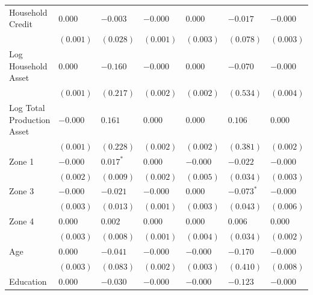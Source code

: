 \begin{tabular}{lllllll}
Household Credit                        &     $0.000$ &      $-0.003$ &     $-0.000$ &       $0.000$ &         $-0.017$ &      $-0.000$ \\
                                        &   $(0.001)$ &     $(0.028)$ &    $(0.001)$ &     $(0.003)$ &        $(0.078)$ &     $(0.003)$ \\
Log Household Asset                     &     $0.000$ &      $-0.160$ &     $-0.000$ &       $0.000$ &         $-0.070$ &      $-0.000$ \\
                                        &   $(0.001)$ &     $(0.217)$ &    $(0.002)$ &     $(0.002)$ &        $(0.534)$ &     $(0.004)$ \\
Log Total Production Asset              &    $-0.000$ &       $0.161$ &      $0.000$ &       $0.000$ &          $0.106$ &       $0.000$ \\
                                        &   $(0.001)$ &     $(0.228)$ &    $(0.002)$ &     $(0.002)$ &        $(0.381)$ &     $(0.002)$ \\
Zone 1                                  &    $-0.000$ &  $0.017 ^{*}$ &      $0.000$ &      $-0.000$ &         $-0.022$ &      $-0.000$ \\
                                        &   $(0.002)$ &     $(0.009)$ &    $(0.002)$ &     $(0.005)$ &        $(0.034)$ &     $(0.003)$ \\
Zone 3                                  &    $-0.000$ &      $-0.021$ &     $-0.000$ &       $0.000$ &    $-0.073 ^{*}$ &      $-0.000$ \\
                                        &   $(0.003)$ &     $(0.013)$ &    $(0.001)$ &     $(0.003)$ &        $(0.043)$ &     $(0.006)$ \\
Zone 4                                  &     $0.000$ &       $0.002$ &      $0.000$ &       $0.000$ &          $0.006$ &       $0.000$ \\
                                        &   $(0.003)$ &     $(0.008)$ &    $(0.001)$ &     $(0.004)$ &        $(0.034)$ &     $(0.002)$ \\
Age                                     &     $0.000$ &      $-0.041$ &     $-0.000$ &      $-0.000$ &         $-0.170$ &      $-0.000$ \\
                                        &   $(0.003)$ &     $(0.083)$ &    $(0.002)$ &     $(0.003)$ &        $(0.410)$ &     $(0.008)$ \\
Education                               &     $0.000$ &      $-0.030$ &     $-0.000$ &      $-0.000$ &         $-0.123$ &      $-0.000$ \\

\end{tabular}
